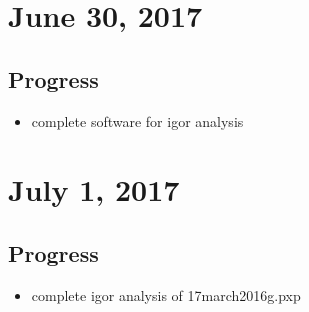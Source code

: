 \documentclass{article}
\begin{document}
\section{June 30, 2017}
\subsection{Progress}
\begin{itemize}
  \item complete software for igor analysis
\end{itemize}

\section{July 1, 2017}
\subsection{Progress}
\begin{itemize}
  \item complete igor analysis of 17march2016g.pxp
\end{itemize}



\end{document}
